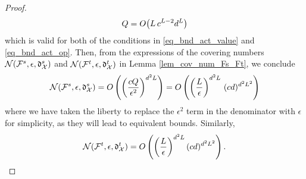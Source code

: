 \documentclass[review,supplement,onefignum,onetabnum]{siamonline250211}
\begin{document}
\begin{proof}
%
\begin{equation*}
\begin{split}
{Q} = O \big( L \, c^{L-2} {d}^{L}   \big)
\end{split}
\end{equation*}
%
which is valid for both of the conditions in \eqref{eq_bnd_act_value} and \eqref{eq_bnd_act_op}.  Then, from the expressions of the covering numbers $\mathcal{N} (  \mathcal{F}^s, \epsilon, \mathfrak{d}^s_{\mathcal{X}} ) $ and $\mathcal{N} (  \mathcal{F}^t, \epsilon, \mathfrak{d}^t_{\mathcal{X}} ) $ in Lemma \ref{lem_cov_num_Fs_Ft}, we conclude
%
\begin{equation*}
\begin{split}
\mathcal{N} (  \mathcal{F}^s, \epsilon, \mathfrak{d}^s_{\mathcal{X}} )  
= O\left( \left( \frac{  c{Q}}{\epsilon^2}  \right)^{{d}^2 L} \right)
= O \left( \left( \frac{L}{\epsilon} \right) ^{{d}^2 L} \, (c {d})^{{d}^2 L^2}  \right)
\end{split}
\end{equation*}
%
where we have taken the liberty to replace the $\epsilon^2$ term in the denominator with  $\epsilon$ for simplicity, as they will lead to equivalent bounds. Similarly,
% 
\begin{equation*}
\begin{split}
\mathcal{N} (  \mathcal{F}^t, \epsilon, \mathfrak{d}^t_{\mathcal{X}} )  
= O \left( \left( \frac{L}{\epsilon} \right) ^{{d}^2 L}  (c {d})^{{d}^2 L^2}  \right).
\end{split}
\end{equation*}


\end{proof}
\end{document}
